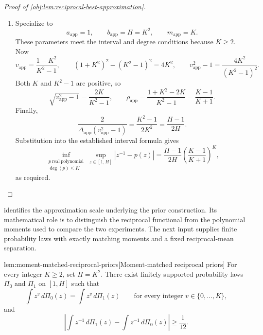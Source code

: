 \documentclass[11pt]{article}
\begin{document}
\begin{proof}[Proof of \cref{obj:lem:reciprocal-best-approximation}]
\begin{enumerate}
\[\begin{aligned}
E_{\mathrm{app}}
&\le
\sum_{\iota=0}^{m_{\mathrm{app}}+1}
|w_{\mathrm{app},\iota}|
\left|z_{\mathrm{app},\iota}^{-1}
-q_{\mathrm{app}}(z_{\mathrm{app},\iota})\right|\\
&\le
\sup_{z\in[a_{\mathrm{app}},b_{\mathrm{app}}]}
|z^{-1}-q_{\mathrm{app}}(z)|.
\end{aligned}
\]
The residuals are continuous on this compact positive interval, so these suprema are finite. The lower bound for every admissible polynomial and the upper bound attained by \(p_{\mathrm{app}}\) establish
\[
\inf_{\substack{q_{\mathrm{app}}\ \mathrm{real\ polynomial}\\
\deg(q_{\mathrm{app}})\le m_{\mathrm{app}}}}
\sup_{z\in[a_{\mathrm{app}},b_{\mathrm{app}}]}
|z^{-1}-q_{\mathrm{app}}(z)|
=
\frac{2\rho_{\mathrm{app}}^{m_{\mathrm{app}}}}
{\Delta_{\mathrm{app}}(v_{\mathrm{app}}^2-1)}.
\]

\item Specialize to
\[
a_{\mathrm{app}}=1,\qquad b_{\mathrm{app}}=H=K^2,
\qquad m_{\mathrm{app}}=K.
\]
These parameters meet the interval and degree conditions because \(K\ge2\).
Now
\[
v_{\mathrm{app}}=\frac{1+K^2}{K^2-1},
\qquad
(1+K^2)^2-(K^2-1)^2=4K^2,
\qquad
v_{\mathrm{app}}^2-1=\frac{4K^2}{(K^2-1)^2}.
\]
Both \(K\) and \(K^2-1\) are positive, so
\[
\sqrt{v_{\mathrm{app}}^2-1}
=\frac{2K}{K^2-1},
\qquad
\rho_{\mathrm{app}}
=
\frac{1+K^2-2K}{K^2-1}
=
\frac{K-1}{K+1}.
\]
Finally,
\[
\frac{2}{\Delta_{\mathrm{app}}(v_{\mathrm{app}}^2-1)}
=
\frac{K^2-1}{2K^2}
=
\frac{H-1}{2H}.
\]
Substitution into the established interval formula gives
\[
\inf_{\substack{p\ \mathrm{real\ polynomial}\\ \deg(p)\le K}}
\sup_{z\in[1,H]}|z^{-1}-p(z)|
=
\frac{H-1}{2H}
\left(\frac{K-1}{K+1}\right)^K,
\]
as required.
\end{enumerate}
\end{proof}

 identifies the approximation scale underlying the prior construction. Its mathematical role is to distinguish the reciprocal functional from the polynomial moments used to compare the two experiments. The next input supplies finite probability laws with exactly matching moments and a fixed reciprocal-mean separation.

\begin{lemmav}{lem:moment-matched-reciprocal-priors}[Moment-matched reciprocal priors]
For every integer \(K\ge 2\), set \(H=K^2\). There exist finitely supported probability laws \(\Pi_0\) and \(\Pi_1\) on \([1,H]\) such that
\[
\int z^v\,d\Pi_0(z)=\int z^v\,d\Pi_1(z)
\qquad\text{for every integer }v\in\{0,\ldots,K\},
\]
and
\[
\left|\int z^{-1}\,d\Pi_1(z)-\int z^{-1}\,d\Pi_0(z)\right|
\ge \frac{1}{12}.
\]
\end{lemmav}
\end{document}

